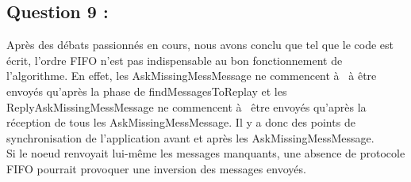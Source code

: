 \documentclass[11pt,a4paper]{report}
\begin{document}
\section{Question 9 :}

Après des débats passionnés en cours, nous avons conclu que tel que le code est écrit, l'ordre FIFO n'est pas indispensable au bon fonctionnement de l'algorithme. En effet, les AskMissingMessMessage ne commencent à  à être envoyés qu'après la phase de findMessagesToReplay et les ReplyAskMissingMessMessage ne commencent à  être envoyés qu'après la réception de tous les AskMissingMessMessage. Il y a donc des points de synchronisation de l'application avant et après les AskMissingMessMessage.\\

Si le noeud renvoyait lui-même les messages manquants, une absence de protocole FIFO pourrait provoquer une inversion des messages envoyés.\\


\chapter{}
\end{document}
